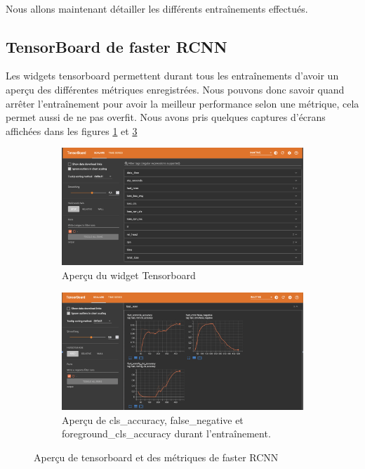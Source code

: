 \paragraph{}Nous allons maintenant détailler les différents entraînements effectués.

\subsection{TensorBoard de faster RCNN }\label{anal:train_rcnn}
Les widgets tensorboard permettent durant tous les entraînements d'avoir un aperçu des différentes métriques enregistrées. Nous pouvons donc savoir quand arrêter l'entraînement pour avoir la meilleur performance selon une métrique, cela permet aussi de ne pas overfit. Nous avons pris quelques captures d'écrans affichées dans les figures \ref{fig:tensorboard_overview} et \ref{fig:tensorboard_metric}
\begin{figure}[h!]
    \centering
    \begin{subfigure}[t]{0.49\textwidth}
        \centering
        \includegraphics[width=\textwidth]{images/tensorboard_large.png}
        \caption{Aperçu du widget Tensorboard}
        \label{fig:tensorboard_overview}
    \end{subfigure}
    \begin{subfigure}[t]{0.49\textwidth}
        \centering
        \includegraphics[width=\textwidth]{images/tensorboard_metric.png}
        \caption{Aperçu de cls\_accuracy, false\_negative et foreground\_cls\_accuracy durant l'entraînement.}
        \label{fig:tensorboard_metric}
    \end{subfigure}
    \caption{Aperçu de tensorboard et des métriques de faster RCNN}
\end{figure}
